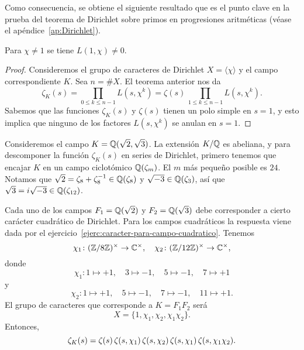 Como consecuencia, se obtiene el siguiente resultado que es el punto clave en
la prueba del teorema de Dirichlet sobre primos en progresiones aritméticas
(véase el apéndice~\ref{ap:Dirichlet}).

\begin{corolario}
  \label{cor:L(1,chi)-ne-0}
  Para $\chi \ne 1$ se tiene $L (1,\chi) \ne 0$.

  \begin{proof}
    Consideremos el grupo de caracteres de Dirichlet $X = \langle\chi\rangle$
    y el campo correspondiente $K$. Sea $n = \# X$. El teorema anterior nos da
    \[ \zeta_K (s) = \prod_{0 \le k \le n-1} L (s,\chi^k) =
       \zeta (s) \, \prod_{1 \le k \le n-1} L (s,\chi^k). \]
    Sabemos que las funciones $\zeta_K (s)$ y $\zeta (s)$ tienen un polo simple
    en $s = 1$, y esto implica que ninguno de los factores $L (s,\chi^k)$
    se anulan en $s = 1$.
  \end{proof}
\end{corolario}

\begin{ejemplo}
  \label{ej:sqrt-2-sqrt-3-zeta-descomp}
  Consideremos el campo $K = \mathbb{Q} (\sqrt{2},\sqrt{3})$. La extensión $K/\mathbb{Q}$
  es abeliana, y para descomponer la función $\zeta_K (s)$ en series de
  Dirichlet, primero tenemos que encajar $K$ en un campo ciclotómico
  $\mathbb{Q} (\zeta_m)$. El $m$ más pequeño posible es $24$. Notamos que
  $\sqrt{2} = \zeta_8 + \zeta_8^{-1} \in \mathbb{Q} (\zeta_8)$ y
  $\sqrt{-3} \in \mathbb{Q} (\zeta_3)$, así que
  $\sqrt{3} = i\sqrt{-3} \in \mathbb{Q} (\zeta_{12})$.

  Cada uno de los campos $F_1 = \mathbb{Q} (\sqrt{2})$ y $F_2 = \mathbb{Q} (\sqrt{3})$ debe
  corresponder a cierto carácter cuadrático de Dirichlet. Para los campos
  cuadráticos la respuesta viene dada por el
  ejercicio~\ref{ejerc:caracter-para-campo-cuadratico}. Tenemos
  \[ \chi_1\colon (\mathbb{Z}/8\mathbb{Z})^\times \to \mathbb{C}^\times, \quad
     \chi_2\colon (\mathbb{Z}/12\mathbb{Z})^\times \to \mathbb{C}^\times, \]
  donde
  \[ \chi_1\colon 1 \mapsto +1, \quad
     3\mapsto -1, \quad
     5\mapsto -1, \quad
     7\mapsto +1 \]
  y
  \[ \chi_2\colon 1 \mapsto +1, \quad
     5\mapsto -1, \quad
     7\mapsto -1, \quad
     11\mapsto +1. \]
  El grupo de caracteres que corresponde a $K = F_1 F_2$ será
  $$X = \{ 1, \chi_1, \chi_2, \chi_1\chi_2 \}.$$
  Entonces,
  \[ \zeta_K (s) = \zeta (s)\,\zeta (s,\chi_1)\,\zeta (s,\chi_2)\,\zeta (s,\chi_1)\,\zeta (s,\chi_1\chi_2). \qedhere \]
\end{ejemplo}

